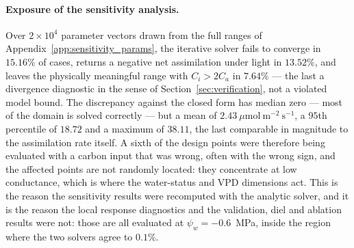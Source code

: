 \documentclass[a4paper,fleqn]{cas-sc}
\begin{document}
\paragraph{Exposure of the sensitivity analysis.}
Over $2\times10^{4}$ parameter vectors drawn from the full ranges of
Appendix~\ref{app:sensitivity_params}, the iterative solver fails to converge
in $15.16\%$ of cases, returns a negative net assimilation under light in
$13.52\%$, and leaves the physically meaningful range with $C_i > 2C_a$ in
$7.64\%$ --- the last a divergence diagnostic in the sense of
Section~\ref{sec:verification}, not a violated model bound. The
discrepancy against the closed form has median zero --- most of the domain is
solved correctly --- but a mean of
$2.43\ \mu\mathrm{mol\ m^{-2}\ s^{-1}}$, a $95$th percentile of $18.72$ and a
maximum of $38.11$, the last comparable in magnitude to the assimilation rate
itself. A sixth of the design points were therefore being evaluated with a
carbon input that was wrong, often with the wrong sign, and the affected
points are not randomly located: they concentrate at low conductance, which is
where the water-status and VPD dimensions act. This is the reason the
sensitivity results were recomputed with the analytic solver, and it is the
reason the local response diagnostics and the validation, diel and ablation
results were not: those are all evaluated at $\psi_w=-0.6$~MPa, inside the
region where the two solvers agree to $0.1\%$.
\end{document}
